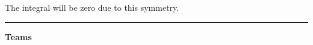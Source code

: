 \documentclass[12pt,letterpaper,noanswers]{exam}
\begin{document}
The integral will be zero due to this symmetry.




\vspace{0.2cm}
\hrule
\vspace{0.2cm}

















\noindent\textbf{Teams}
\end{document}
